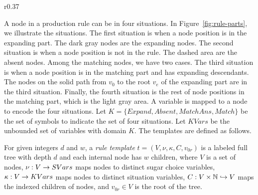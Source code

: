 \begin{wrapfigure}{r}{0.37\textwidth}
    \vspace{-3mm}
        \center
  \caption{Parts of production rules in the rule templates.}
  \label{fig:rule-parts}
  \vspace{-8mm}
\end{wrapfigure}
A node in a production rule can be in four situations.
In Figure~\ref{fig:rule-parts}, we illustrate the situations.
The first situation is when a node position is in the expanding part.
The dark gray nodes are the expanding nodes.
The second situation is when a node position is not in the rule.
The dashed area are the absent nodes.
Among the matching nodes, we have two cases.
The third situation is when a node position is in the matching part
and has expanding descendants.
The nodes on the solid path from $v_0$ to the root $v_e$ of the expanding part are in the third situation.
Finally, the fourth situation is the rest of node positions
in the matching part, which is the light gray area.
A variable is mapped to a node to encode the four situations.
Let $K =\{Expand,Absent,MatchAns,Match\}$ be the set of symbols to
indicate the set of four situations.
Let $KVars$ be the unbounded set of variables with domain $K$. 
The templates are defined as follows.

\begin{df}
For given integers $d$ and $w$,
a {\em rule template} $t = (V, \nu, \kappa, C, v_{0r})$ is a labeled full tree with depth $d$ and 
each internal node has $w$ children, where 
$V$ is a set of nodes, $\nu : V \rightarrow SVars$ maps nodes to distinct
sugar choice variables, 
$\kappa : V \rightarrow KVars$ maps nodes to distinct situation variables,
$C : V \times \mathbb{N} \hookrightarrow V$ maps the indexed children of nodes,
and
$v_{0r} \in V$ is the root of the tree.
\end{df}

